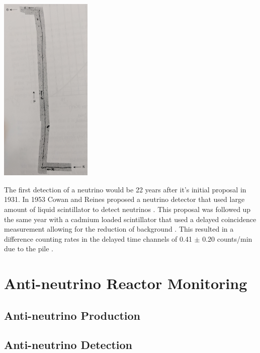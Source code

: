 \documentclass[12pt,a4paper]{article}
\newenvironment{Figure}
  {\par\medskip\noindent\minipage{\linewidth}}
  {\endminipage\par\medskip}
\begin{document}
 

\begin{Figure}
 \centering
 \includegraphics[height=90mm]{less_detailed_path.jpg}
 \label{pion_path}
\end{Figure}

The first detection of a neutrino would be 22 years after it's initial proposal in 1931. In 1953 Cowan and Reines proposed a neutrino detector that used large amount of liquid scintillator to detect neutrinos \cite{reines1953proposed}. This proposal was followed up the same year with a cadmium loaded scintillator that used a delayed coincidence measurement allowing for the reduction of background \cite{reines1953proposed} \cite{reines1953detection}. This resulted in a difference counting rates in the delayed time channels of 0.41 $\pm$ 0.20 counts/min due to the pile \cite{reines1953detection}.

\section{Anti-neutrino Reactor Monitoring}
\subsection{Anti-neutrino Production}
\subsection{Anti-neutrino Detection}
\end{document}
